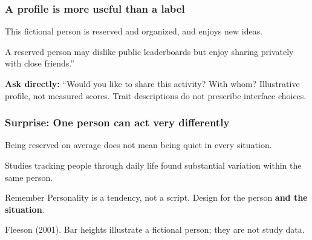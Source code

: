 \documentclass{beamer}
\begin{document}
\begin{frame}
\frametitle{A profile is more useful than a label}
\small
\begin{center}
\end{center}
This fictional person is reserved and organized, and enjoys new ideas.
\medskip

A reserved person may dislike public leaderboards but enjoy sharing privately with close friends.''
\medskip

\textbf{Ask directly:} ``Would you like to share this activity? With whom?
\vfill
{\tiny Illustrative profile, not measured scores. Trait descriptions do not prescribe interface choices.}
\end{frame}

\begin{frame}
\frametitle{Surprise: One person can act very differently}
\small
Being reserved on average does not mean being quiet in every situation.
\medskip
\begin{center}
\end{center}
\medskip
Studies tracking people through daily life found substantial variation within the same person.
\begin{block}{Remember}
Personality is a tendency, not a script. Design for the person \textbf{and the situation}.
\end{block}
{\tiny Fleeson (2001). Bar heights illustrate a fictional person; they are not study data.}
\end{frame}
\end{document}
